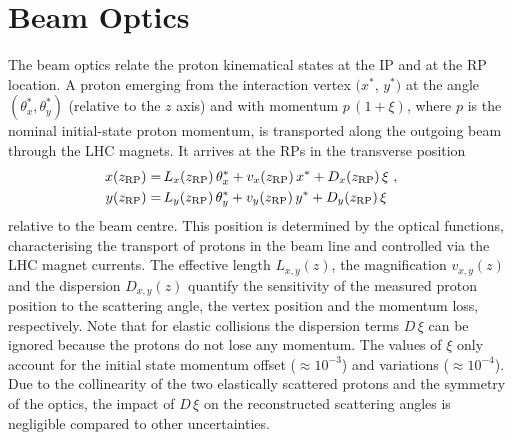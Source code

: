 \section{Beam Optics}
\label{sec:beam optics}

The beam optics relate the proton kinematical states at the IP and at the RP location. A proton emerging from the interaction vertex $(x^*$, $y^*)$ at the angle $(\theta_x^*,\theta_y^*)$ (relative to the $z$ axis) and with momentum $p\,(1+\xi)$, where $p$ is the nominal initial-state proton momentum, is transported along the outgoing beam through the LHC magnets. It arrives at the RPs in the transverse position
\begin{equation}
\label{eq:prot trans}
	\begin{aligned}
		x(z_{\rm RP}) =&\, L_x(z_{\rm RP})\, \theta_x^* + v_x(z_{\rm RP})\, x^* + D_x(z_{\rm RP})\, \xi\ ,\cr
		y(z_{\rm RP}) =&\, L_y(z_{\rm RP})\, \theta_y^* + v_y(z_{\rm RP})\, y^* + D_y(z_{\rm RP})\, \xi \quad
	\end{aligned}
\end{equation}
relative to the beam centre. This position is determined by the optical functions, characterising the transport of protons in the beam line and controlled via the LHC magnet currents.
The effective length $L_{x,y}(z)$, the magnification $v_{x,y}(z)$ and the dispersion $D_{x,y}(z)$ quantify the sensitivity of the measured proton position to the scattering angle, the vertex position and the momentum loss, respectively. Note that for elastic collisions the dispersion terms $D\,\xi$ can be ignored because the protons do not lose any momentum. The values of $\xi$ only account for the initial state momentum offset ($\approx 10^{-3}$) and variations ($\approx 10^{-4}$). Due to the collinearity of the two elastically scattered protons and the symmetry of the optics, the impact of $D\,\xi$ on the reconstructed scattering angles is negligible compared to other uncertainties.


